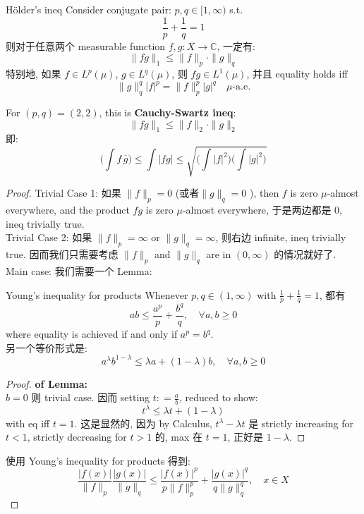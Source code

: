 \documentclass[lang=cn,11pt]{elegantbook}
\begin{document}
\begin{theorem}{Hölder's ineq}
    Consider conjugate pair: $p,q \in [1,\infty)$ s.t.  \[
    \frac{1}{p} + \frac{1}{q} = 1
    \]
则对于任意两个 measurable function $f,g:X \to \mathbb{C}$,  一定有: \[
 \| fg\|_1 \leq \| f\|_p \cdot \|g\|_q 
 \]特别地, 如果 $f \in L^p(\mu)$, $g\in L^q(\mu)$, 则 $fg \in L^1(\mu)$, 并且 equality holds iff \[
   \|g\|_q^q |f|^p = \|f\|_p^p |g|^q \quad \mu\text{-a.e.}
 \]
\end{theorem}
\begin{remark}
For $(p,q) = (2,2)$, this is \textbf{Cauchy-Swartz ineq}: \[
 \| fg\|_1 \leq \| f\|_2 \cdot \|g\|_2
\]
即: \[
 \bigg(\int  f\,\overline{g}   \bigg) \leq \int |fg| \leq  \sqrt{\bigg(\int |f|^2 \bigg)\bigg(\int |g|^2 \bigg)}
\]
\end{remark}
\begin{proof}
Trivial Case 1: 如果 $\|f\|_p = 0$ (或者$\|g\|_q = 0$  ), then $f$ is zero $\mu$-almost everywhere, and the product $fg$ is zero $\mu$-almost everywhere, 于是两边都是 $0$, ineq trivially true.\\
Trivial Case 2: 如果 $\|f\|_p = \infty$ or $\|g\|_q = \infty$, 则右边 infinite, ineq trivially true.
因而我们只需要考虑 $\|f\|_p$ and $\|g\|_q$ are in $(0, \infty)$ 的情况就好了.\\

Main case: 我们需要一个 Lemma: 
\begin{lemma}{Young's inequality for products}
Whenever $p, q \in (1, \infty)$ with $\frac{1}{p} + \frac{1}{q} = 1$, 都有
\begin{equation}
    ab \leq \frac{a^p}{p} + \frac{b^q}{q} ,\quad \forall a,b\geq 0
\end{equation}
where equality is achieved if and only if $a^p = b^q$.\\
另一个等价形式是: \[
a^{\lambda} b^{1-\lambda} \leq \lambda a + (1-\lambda)b,\quad \forall a,b\geq 0
\]
\end{lemma}
\begin{proof}
    \textbf{of Lemma:}\\
    $b=0$ 则 trivial case. 因而 setting $t : =\frac{a}{b}$, reduced to show: \[
    t^\lambda \leq \lambda t  + (1-\lambda)
    \]
  with eq iff $t=1$. 这是显然的, 因为 by Calculus, $t^\lambda -\lambda t$ 是 strictly increasing for $t<1$, strictly decreasing for $t>1$ 的, max 在  $t=1$, 正好是 $1-\lambda$.\end{proof}
使用 Young's inequality for products 得到:
\begin{equation}
    \frac{|f(x)|}{\|f\|_p} \frac{|g(x)|}{\|g\|_q} \leq \frac{|f(x)|^p}{p \|f\|_p^p} + \frac{|g(x)|^q}{q \|g\|_q^q}, \quad x \in X
\end{equation}


\end{proof}
\end{document}
